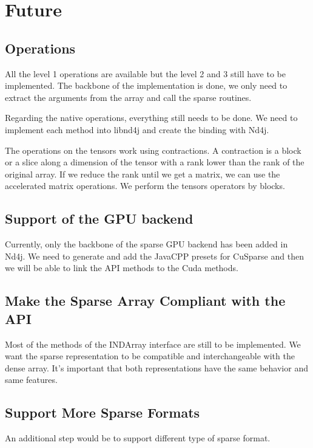 \chapter{Future}

\section{Operations}

All the level 1 operations are available but the level 2 and 3 still have to be implemented. The backbone of the implementation is done, we only need to extract the arguments from the array and call the sparse routines.

Regarding the native operations, everything still needs to be done. We need to implement each method into libnd4j and create the binding with Nd4j.

The operations on the tensors work using contractions. A contraction is a block or a slice along a dimension of the tensor with a rank lower than the rank of the original array. If we reduce the rank until we get a matrix, we can use the accelerated matrix operations. We perform the tensors operators by blocks.

\section{Support of the GPU backend}

Currently, only the backbone of the sparse GPU backend has been added in Nd4j. We need to generate and add the JavaCPP presets for CuSparse and then we will be able to link the API methods to the Cuda methods.

\section{Make the Sparse Array Compliant with the API}

Most of the methods of the INDArray interface are still to be implemented. We want the sparse representation to be compatible and interchangeable with the dense array. It's important that both representations have the same behavior and same features.

\section{Support More Sparse Formats}
\label{sec:moreFormat}

An additional step would be to support different type of sparse format. 

